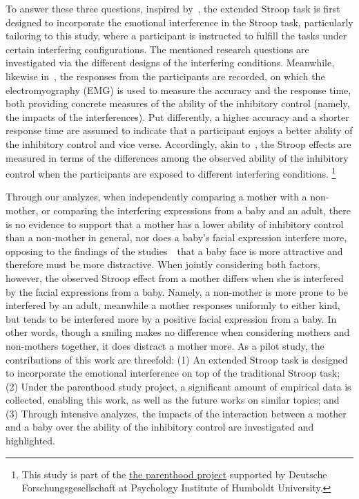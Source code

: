 To answer these three questions,
inspired by~\citep{otte2011interference,lee2007controlling}, 
the extended Stroop task is first designed
to incorporate the emotional interference in the Stroop task,
particularly tailoring to this study,
where
a participant is instructed to fulfill the tasks 
under
certain interfering configurations.
The mentioned research questions are 
investigated via the different designs of the 
interfering conditions.
Meanwhile, 
likewise in~\citep{otte2011interference,lee2007controlling},
the responses from the participants are recorded, on which
the electromyography (EMG) is used to measure the accuracy and the response time, both providing concrete measures of 
the ability of the inhibitory control
(namely, the impacts of the interferences).
Put differently, a higher accuracy and a shorter response time 
are assumed to indicate that a participant 
enjoys a better ability of the inhibitory control and vice verse.
Accordingly, akin to~\citep{bugg2008multiple}, the Stroop effects are
measured in terms of the differences among
the observed ability of the inhibitory control when the participants are exposed to different interfering conditions.
\footnote{This study is part of the 
\href{https://www.psychologie.hu-berlin.de/de/prof/bio/forschung/forschungsprojekte}{the parenthood project}
supported by Deutsche Forschungsgesellschaft
at Psychology Institute of Humboldt University. }  


Through our analyzes,
when independently comparing a mother with a non-mother,
or comparing the interfering expressions from
a baby and an adult,
there is no evidence to support that 
a mother has a lower ability of 
inhibitory control than a non-mother in general,
nor does a baby's facial expression interfere more,
opposing to the findings of the studies~\citep{lorenz1943angeborenen,glocker2009baby,luo2011children,sanefuji2007development}~that a baby face is more attractive and therefore
must be more distractive.
When jointly considering both factors, however,
the observed Stroop effect 
from a mother differs when she is interfered 
by the facial expressions from a baby.
Namely,
a non-mother is more prone to 
be interfered by
an adult, 
meanwhile a mother responses uniformly to either kind,
but tends to be interfered more by a positive facial expression from a baby.
In other words,
though a smiling makes no difference when considering mothers and non-mothers together,
it does distract a mother more.
As a pilot study, the contributions of this work are threefold: 
(1) An extended Stroop task is designed to incorporate the emotional interference on top of the traditional Stroop task;
(2) Under the parenthood study project, a significant amount 
of empirical data is collected, enabling this work, as well as 
the future works on similar topics;
and (3) Through intensive analyzes, 
the impacts of the 
interaction between a mother and a baby over the ability
of the inhibitory control are investigated and highlighted.


